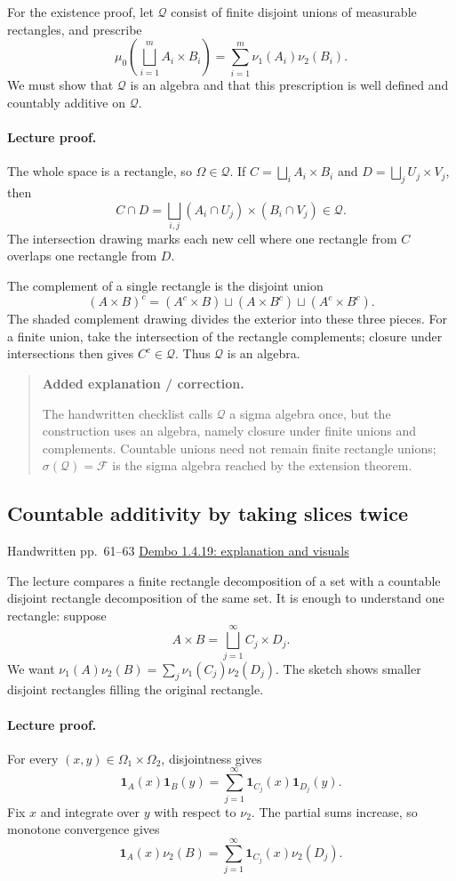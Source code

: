 \documentclass[11pt,letterpaper]{article}
\newcommand{\lecturesection}[1]{\subsection{#1}}
\begin{document}
For the existence proof, let $\mathcal Q$ consist of finite disjoint unions of measurable rectangles, and prescribe \[\mu_0\left(\bigsqcup_{i=1}^m A_i\times B_i\right)=\sum_{i=1}^m\nu_1(A_i)\nu_2(B_i).\] We must show that $\mathcal Q$ is an algebra and that this prescription is well defined and countably additive on $\mathcal Q$.

\paragraph{Lecture proof.}
The whole space is a rectangle, so $\Omega\in\mathcal Q$. If $C=\bigsqcup_i A_i\times B_i$ and $D=\bigsqcup_j U_j\times V_j$, then \[C\cap D=\bigsqcup_{i,j}(A_i\cap U_j)\times(B_i\cap V_j)\in\mathcal Q.\] The intersection drawing marks each new cell where one rectangle from $C$ overlaps one rectangle from $D$.

The complement of a single rectangle is the disjoint union \[ (A\times B)^c=(A^c\times B)\sqcup(A\times B^c)\sqcup(A^c\times B^c).\] The shaded complement drawing divides the exterior into these three pieces. For a finite union, take the intersection of the rectangle complements; closure under intersections then gives $C^c\in\mathcal Q$. Thus $\mathcal Q$ is an algebra.

\begin{quote}\small\textbf{Added explanation / correction.}

The handwritten checklist calls $\mathcal Q$ a sigma algebra once, but the construction uses an algebra, namely closure under finite unions and complements. Countable unions need not remain finite rectangle unions; $\sigma(\mathcal Q)=\mathcal F$ is the sigma algebra reached by the extension theorem.
\end{quote}

\hypertarget{l7-s10}{}
\lecturesection{Countable additivity by taking slices twice}
{\small\textcolor{lectureink}{Handwritten pp.\ 61--63} \quad \href{https://josephrbailey.com/probability/\#entry-1-4-19}{Dembo 1.4.19: explanation and visuals}}

The lecture compares a finite rectangle decomposition of a set with a countable disjoint rectangle decomposition of the same set. It is enough to understand one rectangle: suppose \[A\times B=\bigsqcup_{j=1}^{\infty}C_j\times D_j.\] We want $\nu_1(A)\nu_2(B)=\sum_j\nu_1(C_j)\nu_2(D_j)$. The sketch shows smaller disjoint rectangles filling the original rectangle.

\paragraph{Lecture proof.}
For every $(x,y)\in\Omega_1\times\Omega_2$, disjointness gives \[\mathbf{1}_A(x)\mathbf{1}_B(y)=\sum_{j=1}^{\infty}\mathbf{1}_{C_j}(x)\mathbf{1}_{D_j}(y).\] Fix $x$ and integrate over $y$ with respect to $\nu_2$. The partial sums increase, so monotone convergence gives \[\mathbf{1}_A(x)\nu_2(B)=\sum_{j=1}^{\infty}\mathbf{1}_{C_j}(x)\nu_2(D_j).\]
\end{document}
